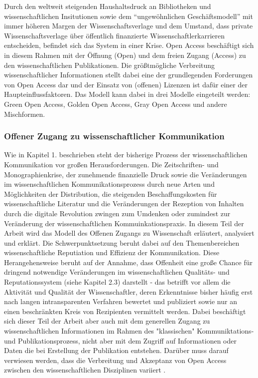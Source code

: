 Durch den weltweit steigenden Haushaltsdruck an Bibliotheken und wissenschaftlichen Insitutionen sowie dem “ungewöhnlichen Geschäftsmodell”\cite{cite:12} mit immer höheren Margen der Wissenschaftsverlage und dem Umstand, dass private Wissenschaftsverlage über öffentlich finanzierte Wissenschaftlerkarrieren entscheiden\cite{heise_2012}, befindet sich das System in einer Krise\cite{cite:14}. Open Access beschäftigt sich in diesem Rahmen mit der Öffnung (Open) und dem freien Zugang (Access) zu den wissenschaftlichen Publikationen. Die größtmögliche Verbreitung wissenschaftlicher Informationen stellt dabei eine der grundlegenden Forderungen von Open Access dar\cite{cite:15} und der Einsatz von (offenen) Lizenzen ist dafür einer der Haupteinflussfaktoren\cite{cite:16}. Das Modell kann dabei in drei Modelle eingeteilt werden: Green Open Access, Golden Open Access, Gray Open Access und andere Mischformen.
\subsubsection{Offener Zugang zu wissenschaftlicher Kommunikation}
Wie in Kapitel 1. beschrieben steht der bisherige Prozess der wissenschaftlichen Kommunikation vor großen Herausforderungen. Die Zeitschriften- und Monographienkrise, der zunehmende finanzielle Druck sowie die Veränderungen im wissenschaftlichen Kommunikationsprozess durch neue Arten und Möglichkeiten der Distribution, die steigenden Beschaffungskosten für wissenschaftliche Literatur\cite{cite:17} und die Veränderungen der Rezeption von Inhalten durch die digitale Revolution zwingen zum Umdenken oder zumindest zur Veränderung der wissenschaftlichen Kommuinkationspraxis. In diesem Teil der Arbeit wird das Modell des Offenen Zugangs zu Wissenschaft erläutert, analysiert und erklärt.
Die Schwerpunktsetzung beruht dabei auf den Themenbereichen wissenschaftliche Reputiation und Effizienz der Kommunikation. Diese Herangehensweise beruht auf der Annahme, dass Offenheit eine große Chance für dringend notwendige Veränderungen im wissenschaftlichen Qualitäts- und Reputationssystem (siehe Kapitel 2.3) darstellt - das betrifft vor allem die Aktivität und Qualität der Wissenschaftler, deren Erkenntnisse bisher häufig erst nach langen intransparenten Verfahren bewertet und publiziert sowie nur an einen beschränkten Kreis von Rezipienten vermittelt werden. Dabei beschäftigt sich dieser Teil der Arbeit aber auch mit dem generellen Zugang zu wissenschaftlichen Informationen im Rahmen des "klassischen" Kommuniktations- und Publikationsprozess, nicht aber mit dem Zugriff auf Informationen oder Daten die bei Erstellung der Publikation entstehen. Darüber muss darauf verwiesen werden, dass die Verbreitung und Akzeptanz von Open Access zwischen den wissenschaftlichen Disziplinen variiert\cite{cite:21a} .
